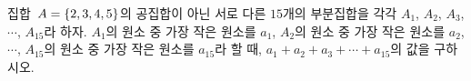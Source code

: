 집합~$A=\{2{,}\mkern3mu\mathopen{}3{,}\mkern3mu\mathopen{}4{,}\mkern3mu\mathopen{}5\}$의 공집합이 아닌 서로 다른 $15$개의 부분집합을 각각 $A_1$, $A_2$, $A_3$, $\cdots$, $A_{15}$라 하자. $A_1$의 원소 중 가장 작은 원소를 $a_1$, $A_2$의 원소 중 가장 작은 원소를 $a_2$, $\cdots$, $A_{15}$의 원소 중 가장 작은 원소를 $a_{15}$라 할 때, $a_1+a_2+a_3+\cdots+a_{15}$의 값을 구하시오.
